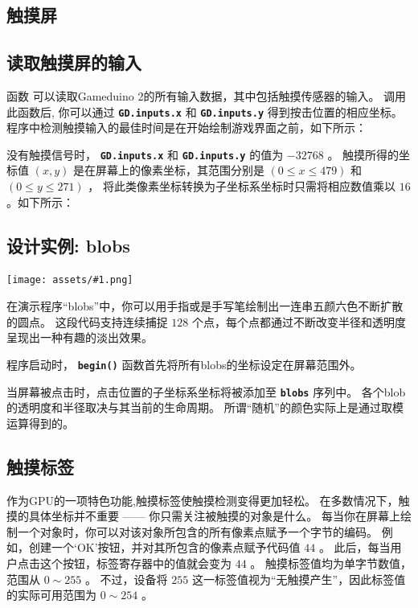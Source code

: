 \documentclass[10pt]{book}
\newcommand{\png}[1]{
\begin{center}
\texttt{[image: assets/\#1.png]}
\end{center}
}
\newcommand{\mach}[1]{\texttt{\textbf{#1}}}
\begin{document}
\begin{CJK}{UTF8}{gkai}
\chapter{触摸屏}

\section{读取触摸屏的输入}

函数  可以读取Gameduino 2的所有输入数据，其中包括触摸传感器的输入。
调用此函数后, 你可以通过 
\mach{GD.inputs.x} 和
\mach{GD.inputs.y} 得到按击位置的相应坐标。 
程序中检测触摸输入的最佳时间是在开始绘制游戏界面之前，如下所示：


没有触摸信号时， \mach{GD.inputs.x} 和 \mach{GD.inputs.y} 的值为 $-32768$ 。
触摸所得的坐标值 $(x,y)$ 是在屏幕上的像素坐标，其范围分别是
 $(0 \le x \le 479)$  和  $(0 \le y \le 271)$ ，
将此类像素坐标转换为子坐标系坐标时只需将相应数值乘以 $16$ 。如下所示：

\newpage
\section{设计实例: blobs}
\png{blobs}
在演示程序``blobs''中，你可以用手指或是手写笔绘制出一连串五颜六色不断扩散的圆点。
这段代码支持连续捕捉 $128$ 个点，每个点都通过不断改变半径和透明度呈现出一种有趣的淡出效果。 

程序启动时， \mach{begin()} 函数首先将所有blobs的坐标设定在屏幕范围外。


当屏幕被点击时，点击位置的子坐标系坐标将被添加至 \mach{blobs} 序列中。
各个blob的透明度和半径取决与其当前的生命周期。
所谓``随机''的颜色实际上是通过取模运算得到的。 


\section{触摸标签}

作为GPU的一项特色功能,触摸标签使触摸检测变得更加轻松。
在多数情况下，触摸的具体坐标并不重要 —— 你只需关注被触摸的对象是什么。
每当你在屏幕上绘制一个对象时，你可以对该对象所包含的所有像素点赋予一个字节的编码。
例如，创建一个`OK'按钮，并对其所包含的像素点赋予代码值 $44$ 。
此后，每当用户点击这个按钮，标签寄存器中的值就会变为 $44$ 。
触摸标签值均为单字节数值，范围从 $0\sim255$ 。
不过，设备将 $255$ 这一标签值视为``无触摸产生''，因此标签值的实际可用范围为 $0\sim254$ 。


\end{CJK}
\end{document}

